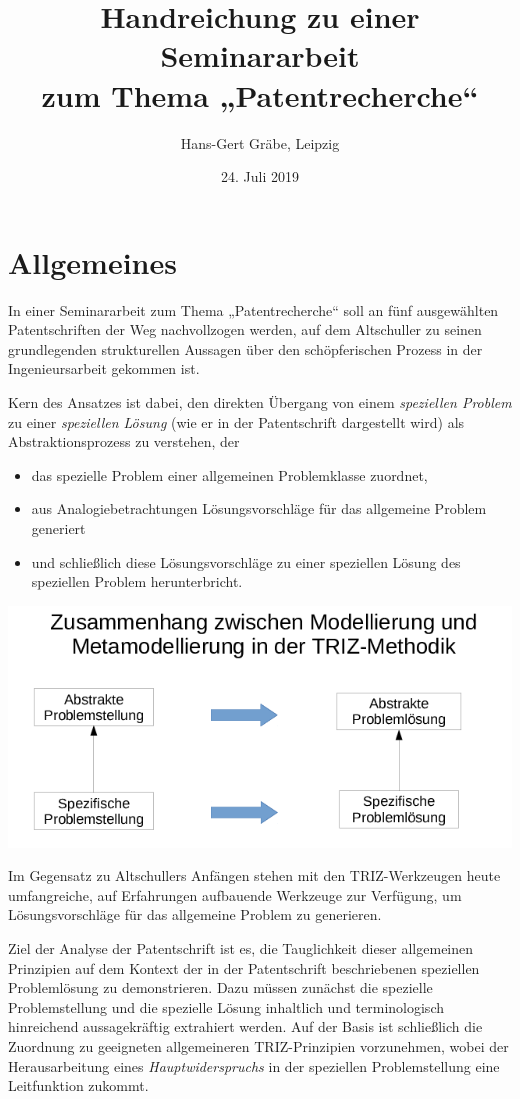 \documentclass[11pt,a4paper]{article}
\title{Handreichung zu einer Seminararbeit\\[4pt] zum Thema „Patentrecherche“}
\author{Hans-Gert Gräbe, Leipzig}
\date{24. Juli 2019}
\begin{document}
\maketitle

\section{Allgemeines}

In einer Seminararbeit zum Thema „Patentrecherche“ soll an fünf ausgewählten
Patentschriften der Weg nachvollzogen werden, auf dem Altschuller zu seinen
grundlegenden strukturellen Aussagen über den schöpferischen Prozess in der
Ingenieursarbeit gekommen ist.

Kern des Ansatzes ist dabei, den direkten Übergang von einem \emph{speziellen
  Problem} zu einer \emph{speziellen Lösung} (wie er in der Patentschrift
dargestellt wird) als Abstraktionsprozess zu verstehen, der
\begin{itemize}
\item das spezielle Problem einer allgemeinen Problemklasse zuordnet,
\item aus Analogiebetrachtungen Lösungsvorschläge für das allgemeine Problem
  generiert
\item und schließlich diese Lösungsvorschläge zu einer speziellen Lösung des
  speziellen Problem herunterbricht.
\end{itemize}
\begin{center}
  \includegraphics[width=.7\textwidth]{2019-04-25/Folie-1.png}
\end{center}
Im Gegensatz zu Altschullers Anfängen stehen mit den TRIZ-Werkzeugen heute
umfangreiche, auf Erfahrungen aufbauende Werkzeuge zur Verfügung, um
Lösungsvorschläge für das allgemeine Problem zu generieren.

Ziel der Analyse der Patentschrift ist es, die Tauglichkeit dieser allgemeinen
Prinzipien auf dem Kontext der in der Patentschrift beschriebenen speziellen
Problemlösung zu demonstrieren.  Dazu müssen zunächst die spezielle
Problemstellung und die spezielle Lösung inhaltlich und terminologisch
hinreichend aussagekräftig extrahiert werden. Auf der Basis ist schließlich
die Zuordnung zu geeigneten allgemeineren TRIZ-Prinzipien vorzunehmen, wobei
der Herausarbeitung eines \emph{Hauptwiderspruchs} in der speziellen
Problemstellung eine Leitfunktion zukommt.
\end{document}
